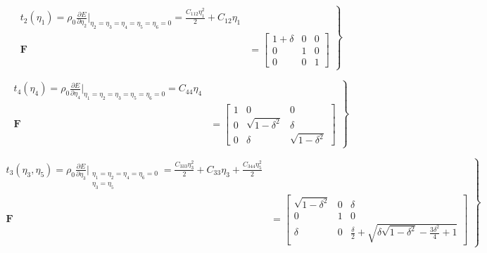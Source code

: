 \documentclass[showpacs,aps,floatfix,prb,reprint,superscriptaddress,onecolumn]{revtex4-1}
\begin{document}
\begin{equation}
\label{eqn:SM-s6}
  \left.\begin{aligned}
        t_{2} \left(\eta_{1}\right) = \rho_{0} \frac{\partial E}{\partial \eta_{2}}\Bigr|_{\eta_2=\eta_3=\eta_4=\eta_5=\eta_6=0} = \frac{C_{112}\eta_{1}^2}{2} + C_{12}\eta_{1}\\
        \bm{F}&=\begin{bmatrix} 1+\delta & 0 & 0 \\ 0 & 1 & 0 \\ 0 & 0 & 1 \end{bmatrix}
       \end{aligned}
			\right\}
\end{equation}


\begin{equation}
\label{eqn:SM-s7}
  \left.\begin{aligned}
        t_{4} \left(\eta_{4}\right) = \rho_{0} \frac{\partial E}{\partial \eta_{4}}\Bigr|_{\eta_1=\eta_2=\eta_3=\eta_5=\eta_6=0} = C_{44}\eta_{4}\\
        \bm{F}&=\begin{bmatrix} 1 & 0 & 0 \\ 0 & \sqrt{1-\delta^2} & \delta \\ 0 & \delta & \sqrt{1-\delta^2} \end{bmatrix}
       \end{aligned}
			\right\}
\end{equation}



\begin{equation}
\label{eqn:SM-s8}
  \left.\begin{aligned}
        t_{3} \left(\eta_{3}, \eta_{5}\right) = \rho_{0} \frac{\partial E}{\partial \eta_{3}}\Bigr|_{\substack{\eta_1=\eta_2=\eta_4=\eta_6=0\\ \eta_{3}=\eta_{5}}} = \frac{C_{333}\eta_{3}^2}{2} + C_{33}\eta_{3} + \frac{C_{344}\eta_{5}^2}{2}\\
        \bm{F}&=\begin{bmatrix} \sqrt{1-\delta^2} & 0 & \delta \\ 0 & 1 & 0 \\ \delta & 0 & \frac{\delta}{2} + \sqrt{\delta \sqrt{1-\delta^2} - \frac{3 \delta^{2}}{4} + 1} \end{bmatrix}
       \end{aligned}
			\right\}
\end{equation}
\end{document}
